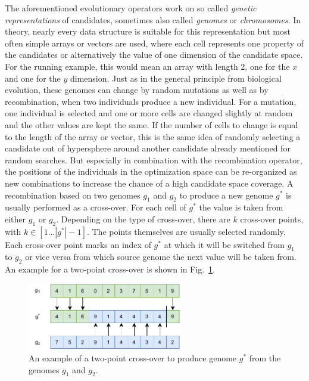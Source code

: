 The aforementioned evolutionary operators work on so called \textit{genetic representations} of candidates, sometimes also called \textit{genomes} or \textit{chromosomes}.
In theory, nearly every data structure is suitable for this representation but most often simple arrays or vectors are used, where each cell represents one property of the candidates or alternatively the value of one dimension of the candidate space.
For the running example, this would mean an array with length 2, one for the $x$ and one for the $y$ dimension.\newline
Just as in the general principle from biological evolution, these genomes can change by random mutations as well as by recombination, when two individuals produce a new individual.
For a mutation, one individual is selected and one or more cells are changed slightly at random and the other values are kept the same.
If the number of cells to change is equal to the length of the array or vector, this is the same idea of randomly selecting a candidate out of hypersphere around another candidate already mentioned for random searches.
But especially in combination with the recombination operator, the positions of the individuals in the optimization space can be re-organized as new combinations to increase the chance of a high candidate space coverage.\newline
A recombination based on two genomes $g_1$ and $g_2$ to produce a new genome $g^*$ is usually performed as a cross-over.
For each cell of $g^*$ the value is taken from either $g_1$ or $g_2$.
Depending on the type of cross-over, there are $k$ cross-over points, with $k \in [1 ... |g^*| - 1]$.
The points themselves are usually selected randomly.
Each cross-over point marks an index of $g^*$ at which it will be switched from $g_1$ to $g_2$ or vice versa from which source genome the next value will be taken from.
An example for a two-point cross-over is shown in Fig.~\ref{fig:theory:crossover}.
\begin{figure}[ht!]
    \centering
    \includegraphics[width=0.6\textwidth,keepaspectratio]{gfx/Figures/Theory/Crossover.pdf}
    \caption{An example of a two-point cross-over to produce genome $g^*$ from the genomes $g_1$ and $g_2$.}
    \label{fig:theory:crossover}
\end{figure}

